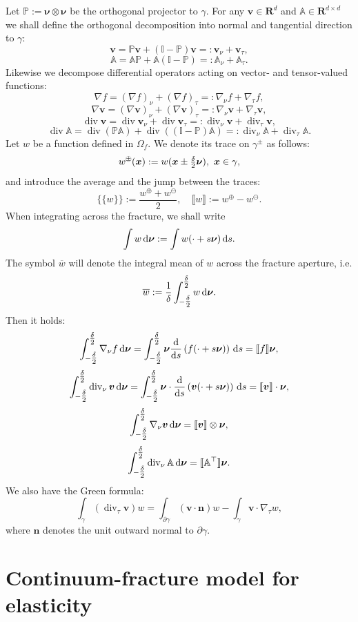 \documentclass[a4paper]{article}
\def\avg#1{\{\!\{#1\}\!\}}
\def\d {\,{\rm d}}
\def\div{\operatorname{div}}
\def\dn{\d\nnu}
\def\jmp#1{\llbracket #1 \rrbracket}
\def\nn{\vc n}
\def\nnu{\vc\nu}
\def\prtl{\partial}
\def\Real{{\mathbf R}}
\def\tn#1{{\mathbb{#1}}}    %
\def\vc#1{\mathbf{\boldsymbol{#1}}}     %
\def\vv{\vc v}
\def\xx{\vc x}
\newcommand{\eq}[1]{\begin{equation}#1\end{equation}}
\newcommand{\opm}{ %
  {\mathbin{
    \mathchoice
      {\buildcirclepm{\displaystyle     }{0.14ex}{0.95}{0.05ex}{.7}}
      {\buildcirclepm{\textstyle        }{0.14ex}{0.95}{0.05ex}{.7}}
      {\buildcirclepm{\scriptstyle      }{0.13ex}{0.955}{0.04ex}{.55}}
      {\buildcirclepm{\scriptscriptstyle}{0.08ex}{0.95}{0.03ex}{.45}}
  }} 
}
\newcommand\buildcirclepm[5]{%
  \begin{tikzpicture}[baseline=(X.base), inner sep=-#5, outer sep=-.65]
    \node[draw,circle,line width=#4] (X)  {\footnotesize\raisebox{#2}{\scalebox{#3}{$#1\pm$}}};
  \end{tikzpicture}%
}
\begin{document}
Let $\tn P := \nnu\otimes\nnu$ be the orthogonal projector to $\gamma$.
For any $\vv\in\Real^d$ and $\tn A\in\Real^{d\times d}$ we shall define the orthogonal decomposition into normal and tangential direction to $\gamma$:
\eq{ \vv = \tn P\vv + (\tn I-\tn P)\vv =:\vv_\nu + \vv_\tau, }
\eq{ \tn A = \tn A\tn P + \tn A(\tn I-\tn P) =: \tn A_\nu + \tn A_\tau. }
Likewise we decompose differential operators acting on vector- and tensor-valued functions:
\eq{ \label{eq:grad_sc} \nabla f = (\nabla f)_\nu + (\nabla f)_\tau =: \nabla_\nu f + \nabla_\tau f, }
\eq{ \label{eq:grad_vc} \nabla\vv = (\nabla\vv)_\nu + (\nabla\vv)_\tau =: \nabla_\nu\vv + \nabla_\tau\vv, }
\eq{ \div\vv = \div\vv_\nu + \div\vv_\tau =: \div_\nu\vv + \div_\tau\vv, }
\eq{ \label{eq:div_tn} \div\tn A = \div(\tn P\tn A) + \div((\tn I-\tn P)\tn A) =: \div_\nu\tn A + \div_\tau\tn A. }
Let $w$ be a function defined in $\Omega_f$.
We denote its trace on $\gamma^\pm$ as follows:
\eq{ w^{\opm}(\xx) := w(\xx\pm\tfrac\delta2\nnu), ~\xx\in\gamma, }
and introduce the average and the jump between the traces:
\eq{ \avg{w} := \frac{w^\oplus+w^\ominus}2,\quad \jmp{w} := w^\oplus-w^\ominus. }
When integrating across the fracture, we shall write
\[ \int w\dn := \int w(\cdot+s\nnu)\d s. \]
The symbol $\overline w$ will denote the integral mean of $w$ across the fracture aperture, i.e.
\eq{\label{eq:def_mean} \overline w:=\frac1\delta\int_{-\tfrac\delta2}^{\tfrac\delta2} w \dn. }
Then it holds:
\eq{ \label{eq:int_grad_nu_sc}
\int_{-\tfrac\delta2}^{\tfrac\delta2}\nabla_\nu f\dn = \int_{-\tfrac\delta2}^{\tfrac\delta2}\nnu\frac{\rm d}{{\rm d}s}\left(f(\cdot+s\nnu)\right)\d s = \jmp{f}\nnu,
}
\eq{ \label{eq:div_nu_vc}
\int_{-\tfrac\delta2}^{\tfrac\delta2}\div_\nu\vv\dn = \int_{-\tfrac\delta2}^{\tfrac\delta2}\nnu\cdot\frac{\rm d}{{\rm d}s}\left(\vv(\cdot+s\nnu)\right)\d s = \jmp{\vv}\cdot\nnu,
}
\eq{ \label{eq:int_grad_nu_vc} \int_{-\tfrac\delta2}^{\tfrac\delta2}\nabla_\nu\vv\dn = \jmp{\vv}\otimes\nnu, }
\eq{ \label{eq:int_div_nu_tn} \int_{-\tfrac\delta2}^{\tfrac\delta2}\div_\nu\tn A \dn = \jmp{\tn A^\top}\nnu. }
We also have the Green formula:
\eq{ \int_\gamma(\div_\tau\vv)w = \int_{\prtl\gamma}(\vv\cdot\nn)w - \int_\gamma\vv\cdot\nabla_\tau w, }
where $\nn$ denotes the unit outward normal to $\partial\gamma$.



\section{Continuum-fracture model for elasticity}\label{sec:reduction_elasticity}
\end{document}
